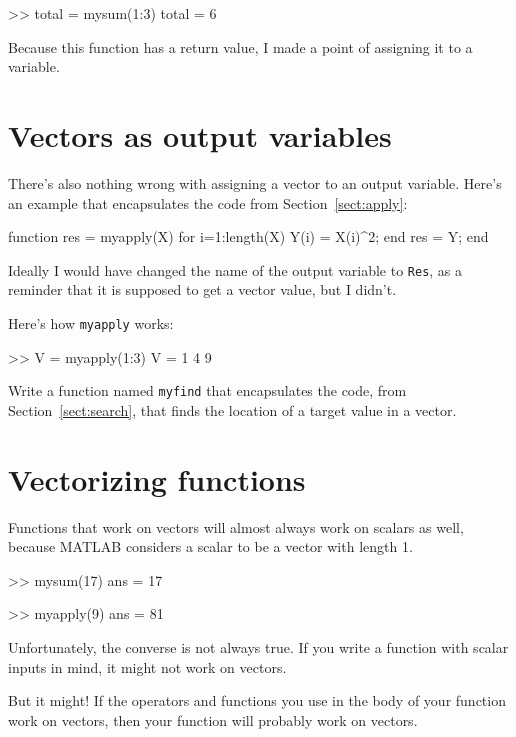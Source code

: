 \documentclass[
]{book}
\numberwithin{Answer}{chapter}
\numberwithin{Exercise}{chapter}
\begin{document}
\begin{code}
>> total = mysum(1:3)
total = 6
\end{code}

Because this function has a return value, I made a
point of assigning it to a variable.


\section{Vectors as output variables}

There's also nothing wrong with assigning a vector to an output
variable.  Here's an example that encapsulates the code from
Section~\ref{sect:apply}:

\begin{code}
function res = myapply(X)
    for i=1:length(X)
        Y(i) = X(i)^2;
    end
    res = Y;
end
\end{code}

Ideally I would have changed the name of the output variable to
{\tt Res}, as a reminder that it is supposed to get a vector value,
but I didn't.

Here's how {\tt myapply} works:

\begin{code}
>> V = myapply(1:3)
V = 1     4     9
\end{code}

\begin{ex}
Write a function named {\tt myfind} that
encapsulates the code, from Section~\ref{sect:search}, that finds the
location of a target value in a vector.
\end{ex}


\section{Vectorizing functions}

Functions that work on vectors will almost always work on scalars
as well, because MATLAB considers a scalar to be a vector with
length 1.

\begin{code}
>> mysum(17)
ans = 17

>> myapply(9)
ans = 81
\end{code}

Unfortunately, the converse is not always true.  If you write
a function with scalar inputs in mind, it might not work on vectors.

But it might!  If the operators and functions
you use in the body of your function work on vectors, then your
function will probably work on vectors.
\end{document}
